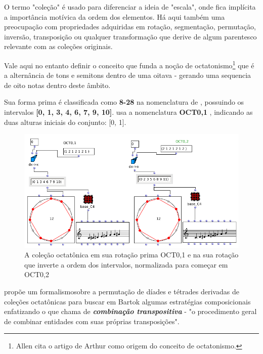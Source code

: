 \documentclass[
	12pt,				%
	openright,			%
	twoside,			%
	a4paper,			%
	english,			%
	french,				%
	spanish,			%
	brazil				%
	]{abntex2}
\begin{document}
O termo "coleção" é usado para diferenciar a ideia de "escala", onde fica implícita a importância motívica da ordem dos elementos. Há aqui também uma preocupação com propriedades adquiridas em rotação, segmentação, permutação, inversão, transposição ou qualquer transformação que derive de algum parentesco relevante com as coleções originais.

Vale aqui no entanto definir o conceito que funda a noção de octatonismo\footnote{Allen  cita o artigo de Arthur  como origem do conceito de octatonismo.} que é a alternância de tons e semitons dentro de uma oitava - gerando uma sequencia de oito notas dentro deste âmbito. 

Sua forma prima é classificada como\textbf{ 8-28} na nomenclatura de , possuindo os intervalos \textbf{[0, 1, 3, 4, 6, 7, 9, 10]}.  usa a nomenclatura  \textbf{OCT0,1 }, indicando as duas alturas iniciais do conjunto: [0, 1].

\begin{figure}[!h]
	\caption{\label{fig_grafico} A coleção octatônica em sua rotação prima OCT0,1 e na sua rotação que inverte a ordem dos intervalos, normalizada para começar em OCT0,2}
	\begin{center}
	    \includegraphics[scale=0.5]{octa/octaOM.png}
	\end{center}
\end{figure}

 propõe um formalismosobre a permutação de díades e tétrades derivadas de coleções octatônicas para buscar em Bartok algumas estratégias composicionais enfatizando o que chama de \textbf{\textit{combinação transpositiva}} - "o procedimento geral de combinar entidades com suas próprias transposições".\cite[ p.x]{cohn1991bartok}
\end{document}
